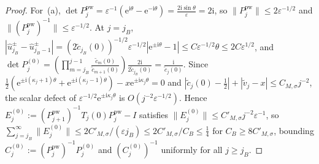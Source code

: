 \documentclass[11pt]{article}
\theoremstyle{definition}
\theoremstyle{remark}
\newcommand{\ii}{\mathrm{i}}
\renewcommand{\_}{\oldunderscore\penalty0\hskip0pt\relax}
\begin{document}
\begin{proof}
For~(a), $\det
  P_j^{\mathrm{pw}}=\varepsilon^{-1}(\mathrm{e}^{\ii\theta}-\mathrm{e}^{-\ii\theta})=\frac{2\ii\sin\theta}{\varepsilon}=2\ii$, so
  $\|P_j^{\mathrm{pw}}\|\le 2\varepsilon^{-1/2}$ and $\|(P_j^{\mathrm{pw}})^{-1}\|\le\varepsilon^{-1/2}$. At $j=j_B$,
  $|\widehat{u}_{j_B}^\pm-\widehat{u}_{j_B-1}^\pm|=(2\tilde{c}_{j_B}(0))^{-1/2}\varepsilon^{-1/2}|\mathrm{e}^{\pm\ii\theta}-1|\le
  C\varepsilon^{-1/2}\theta\le 2C\varepsilon^{1/2}$, and $\det
  P_j^{(0)}=(\prod_{m=j_B}^{j-1}\frac{\tilde{c}_m(0)}{\tilde{c}_{m+1}(0)})\frac{2\ii}{2\tilde{c}_{j_B}(0)}=\frac{\ii}{\tilde{c}_j(0)}$.
  Since
  $\frac12(\mathrm{e}^{\pm\ii(\kappa_j+1)\theta}+\mathrm{e}^{\pm\ii(\kappa_j-1)\theta})-x\mathrm{e}^{\pm\ii\kappa_j\theta}=0$ and
  $|\tilde{c}_j(0)-\frac12|+|\tilde{v}_j-x|\le C_{M,\sigma}j^{-2}$, the scalar defect of
  $\varepsilon^{-1/2}\mathrm{e}^{\pm\ii\kappa_j\theta}$ is $O(j^{-2}\varepsilon^{-1/2})$. Hence
  $E_j^{(0)}:=(P_{j+1}^{\mathrm{pw}})^{-1}T_j(0)P_j^{\mathrm{pw}}-I$ satisfies $\|E_j^{(0)}\|\le
  C'_{M,\sigma}j^{-2}\varepsilon^{-1}$, so $\sum_{j=j_B}^\infty\|E_j^{(0)}\|\le 2C'_{M,\sigma}/(\varepsilon j_B)\le
  2C'_{M,\sigma}/C_B\le\frac14$ for $C_B\ge 8C'_{M,\sigma}$, bounding $C_j^{(0)}:=(P_j^{\mathrm{pw}})^{-1}P_j^{(0)}$ and
  $(C_j^{(0)})^{-1}$ uniformly for all $j\ge j_B$.


\end{proof}
\end{document}
